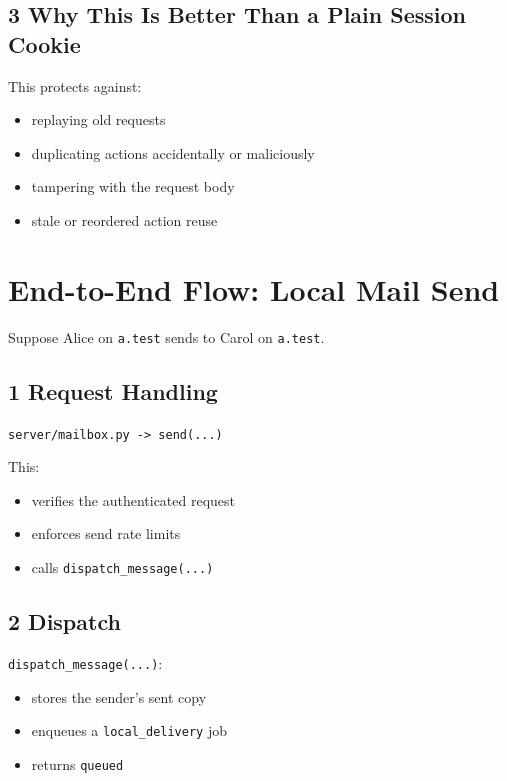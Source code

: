 \documentclass[11pt,a4paper]{article}
\begin{document}
\subsection{3 Why This Is Better Than a Plain Session Cookie}

This protects against:

\begin{itemize}
\item replaying old requests
\item duplicating actions accidentally or maliciously
\item tampering with the request body
\item stale or reordered action reuse
\end{itemize}


\section{End-to-End Flow: Local Mail Send}

Suppose Alice on \nolinkurl{a.test} sends to Carol on \nolinkurl{a.test}.

\subsection{1 Request Handling}

\nolinkurl{server/mailbox.py -> send(...)}

This:

\begin{itemize}
\item verifies the authenticated request
\item enforces send rate limits
\item calls \nolinkurl{dispatch_message(...)}
\end{itemize}

\subsection{2 Dispatch}

\nolinkurl{dispatch_message(...)}:

\begin{itemize}
\item stores the sender's sent copy
\item enqueues a \nolinkurl{local_delivery} job
\item returns \nolinkurl{queued}
\end{itemize}
\end{document}
